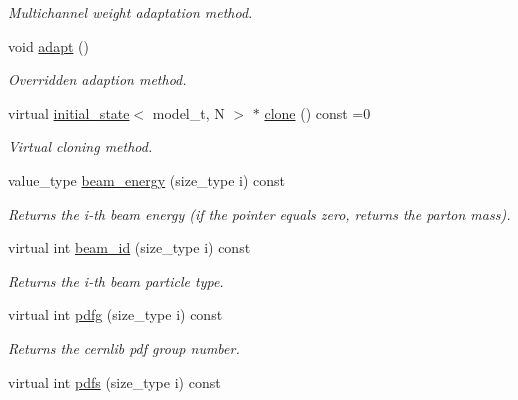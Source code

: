 \begin{DoxyCompactItemize}
\begin{DoxyCompactList}\small\item\em Multichannel weight adaptation method. \end{DoxyCompactList}\item 
\hypertarget{a00308_afe33b79ffa3d873e89e561e881fc97fb}{}void \hyperlink{a00308_afe33b79ffa3d873e89e561e881fc97fb}{adapt} ()\label{a00308_afe33b79ffa3d873e89e561e881fc97fb}

\begin{DoxyCompactList}\small\item\em Overridden adaption method. \end{DoxyCompactList}\item 
\hypertarget{a00308_a80d888f5a90a43d37ec1248d1038ed98}{}virtual \hyperlink{a00308}{initial\+\_\+state}$<$ model\+\_\+t, N $>$ $\ast$ \hyperlink{a00308_a80d888f5a90a43d37ec1248d1038ed98}{clone} () const =0\label{a00308_a80d888f5a90a43d37ec1248d1038ed98}

\begin{DoxyCompactList}\small\item\em Virtual cloning method. \end{DoxyCompactList}\item 
value\+\_\+type \hyperlink{a00308_a0673c7ec9f4eee3c6e62ff7c04cb4cd9}{beam\+\_\+energy} (size\+\_\+type i) const 
\begin{DoxyCompactList}\small\item\em Returns the i-\/th beam energy (if the pointer equals zero, returns the parton mass). \end{DoxyCompactList}\item 
\hypertarget{a00308_ab96d05713defdc01e5ee6ee84f978831}{}virtual int \hyperlink{a00308_ab96d05713defdc01e5ee6ee84f978831}{beam\+\_\+id} (size\+\_\+type i) const \label{a00308_ab96d05713defdc01e5ee6ee84f978831}

\begin{DoxyCompactList}\small\item\em Returns the i-\/th beam particle type. \end{DoxyCompactList}\item 
\hypertarget{a00308_af83a627959bf9bb46ee15dd37d507f09}{}virtual int \hyperlink{a00308_af83a627959bf9bb46ee15dd37d507f09}{pdfg} (size\+\_\+type i) const \label{a00308_af83a627959bf9bb46ee15dd37d507f09}

\begin{DoxyCompactList}\small\item\em Returns the cernlib pdf group number. \end{DoxyCompactList}\item 
\hypertarget{a00308_a7100bd4284c20cb44edabb76d2650db9}{}virtual int \hyperlink{a00308_a7100bd4284c20cb44edabb76d2650db9}{pdfs} (size\+\_\+type i) const \label{a00308_a7100bd4284c20cb44edabb76d2650db9}


\end{DoxyCompactItemize}
